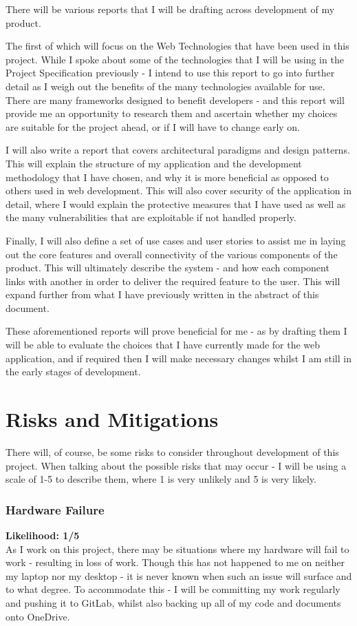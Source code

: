 \documentclass[]{final_report}
\begin{document}
There will be various reports that I will be drafting across development of my product.

The first of which will focus on the Web Technologies that have been used in this project. While I spoke about some of the technologies that I will be using in the Project Specification previously - I intend to use this report to go into further detail as I weigh out the benefits of the many technologies available for use. There are many frameworks designed to benefit developers - and this report will provide me an opportunity to research them and ascertain whether my choices are suitable for the project ahead, or if I will have to change early on.

I will also write a report that covers architectural paradigms and design patterns. This will explain the structure of my application and the development methodology that I have chosen, and why it is more beneficial as opposed to others used in web development. This will also cover security of the application in detail, where I would explain the protective measures that I have used as well as the many vulnerabilities that are exploitable if not handled properly.

Finally, I will also define a set of use cases and user stories to assist me in laying out the core features and overall connectivity of the various components of the product. This will ultimately describe the system - and how each component links with another in order to deliver the required feature to the user. This will expand further from what I have previously written in the abstract of this document. 

These aforementioned reports will prove beneficial for me - as by drafting them I will be able to evaluate the choices that I have currently made for the web application, and if required then I will make necessary changes whilst I am still in the early stages of development.

\chapter*{Risks and Mitigations}

There will, of course, be some risks to consider throughout development of this project. When talking about the possible risks that may occur - I will be using a scale of 1-5 to describe them, where 1 is very unlikely and 5 is very likely.
\subsection*{Hardware Failure}
\textbf{Likelihood: 1/5}\\
As I work on this project, there may be situations where my hardware will fail to work - resulting in loss of work. Though this has not happened to me on neither my laptop nor my desktop - it is never known when such an issue will surface and to what degree. To accommodate this - I will be committing my work regularly and pushing it to GitLab, whilst also backing up all of my code and documents onto OneDrive.
\end{document}
